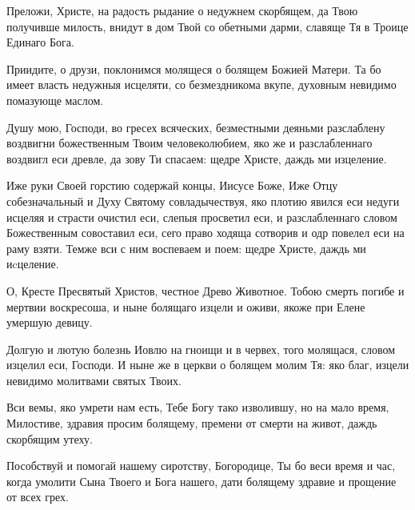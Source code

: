 \begin{mymulticols}
\slava

Преложи, Христе, на радость рыдание о недужнем скорбящем, да Твою получивше милость, внидут в дом Твой со обетными дарми, славяще Тя в Троице Единаго Бога.

\inyne

Приидите, о друзи, поклонимся молящеся о болящем Божией Матери. Та бо имеет власть недужныя исцеляти, со безмездникома вкупе, духовным невидимо помазующе маслом.




Душу мою, Господи, во гресех всяческих, безместными деяньми разслаблену воздвигни божественным Твоим человеколюбием, яко же и разслабленнаго воздвигл еси древле, да зову Ти спасаем: щедре Христе, даждь ми изцеление.




Иже руки Своей горстию содержай концы, Иисусе Боже, Иже Отцу собезначальный и Духу Святому совладычествуя, яко плотию явился еси недуги исцеляя и страсти очистил еси, слепыя просветил еси, и разслабленнаго словом Божественным совоставил еси, сего право ходяща сотворив и одр повелел еси на раму взяти. Темже вси с ним воспеваем и поем: щедре Христе, даждь ми иcцеление.






\normalfont{}О, Кресте Пресвятый Христов, честное Древо Животное. Тобою смерть погибе и мертвии воскресоша, и ныне болящаго изцели и оживи, якоже при Елене умершую девицу.


\normalfont{}Долгую и лютую болезнь Иовлю на гноищи и в червех, того молящася, словом изцелил еси, Господи. И ныне же в церкви о болящем молим Тя: яко благ, изцели невидимо молитвами святых Твоих.

\slava

Вси вемы, яко умрети нам есть, Тебе Богу тако изволившу, но на мало время, Милостиве, здравия просим болящему, премени от смерти на живот, даждь скорбящим утеху.

\inyne

Пособствуй и помогай нашему сиротству, Богородице, Ты бо веси время и час, когда умолити Сына Твоего и Бога нашего, дати болящему здравие и прощение от всех грех.



\end{mymulticols}
